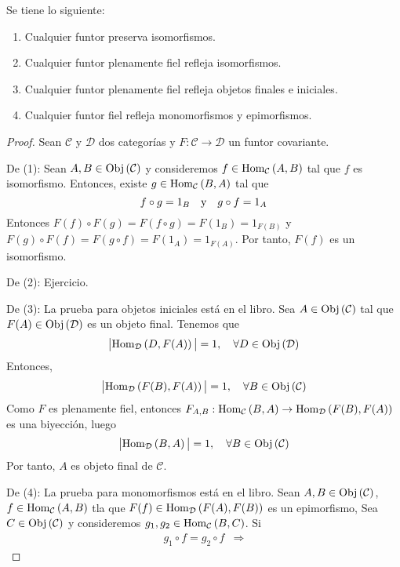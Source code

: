 \documentclass[12pt]{report}
\theoremstyle{largebreak}
\newcommand\abs[1]{\ensuremath{\big|#1\big|}}
\newcommand\cf[3]{\ensuremath{#1:#2\rightarrow#3}}
\newcommand{\Obj}[1]{\ensuremath{\textup{Obj}\left(#1\right)}}
\newcommand{\Hom}[3]{\ensuremath{\textup{Hom}_{#1}\left(#2,#3\right)}}
\begin{document}
    \begin{propo}
        Se tiene lo siguiente:
        \begin{enumerate}
            \item Cualquier funtor preserva isomorfismos.
            \item Cualquier funtor plenamente fiel refleja isomorfismos.
            \item Cualquier funtor plenamente fiel refleja objetos finales e iniciales.
            \item Cualquier funtor fiel refleja monomorfismos y epimorfismos.
        \end{enumerate}
    \end{propo}

    \begin{proof}
        Sean $\mathcal{C}$ y $\mathcal{D}$ dos categorías y $\cf{F}{\mathcal{C}}{\mathcal{D}}$ un funtor covariante.

        De (1): Sean $A,B\in\Obj{\mathcal{C}}$ y consideremos $f\in\Hom{\mathcal{C}}{A}{B}$ tal que $f$ es isomorfismo. Entonces, existe $g\in\Hom{\mathcal{C}}{B}{A}$ tal que
        \begin{equation*}
            f\circ g=1_B\quad\textup{y}\quad g\circ f=1_A
        \end{equation*}
        Entonces $F(f)\circ F(g)=F(f\circ g)=F(1_B)=1_{F(B)}$ y $F(g)\circ F(f)=F(g\circ f)=F(1_A)=1_{F(A)}$.
        Por tanto, $F(f)$ es un isomorfismo.

        De (2): Ejercicio.

        De (3): La prueba para objetos iniciales está en el libro. Sea $A\in\Obj{\mathcal{C}}$ tal que $F(A)\in\Obj{\mathcal{D}}$ es un objeto final. Tenemos que
        \begin{equation*}
            \abs{\Hom{\mathcal{D}}{D}{F(A)}}=1,\quad\forall D\in\Obj{\mathcal{D}}
        \end{equation*}
        Entonces,
        \begin{equation*}
            \abs{\Hom{\mathcal{D}}{F(B)}{F(A)}}=1,\quad\forall B\in\Obj{\mathcal{C}}
        \end{equation*}
        Como $F$ es plenamente fiel, entonces $\cf{F_{A,B}}{\Hom{\mathcal{C}}{B}{A}}{\Hom{\mathcal{D}}{F(B)}{F(A)}}$ es una biyección, luego
        \begin{equation*}
            \abs{\Hom{\mathcal{D}}{B}{A}}=1,\quad\forall B\in\Obj{\mathcal{C}}
        \end{equation*}
        Por tanto, $A$ es objeto final de $\mathcal{C}$.

        De (4): La prueba para monomorfismos está en el libro. Sean $A,B\in\Obj{\mathcal{C}}$, $f\in\Hom{\mathcal{C}}{A}{B}$ tla que $F(f)\in\Hom{\mathcal{D}}{F(A)}{F(B)}$ es un epimorfismo, Sea $C\in\Obj{\mathcal{C}}$ y consideremos $g_1,g_2\in\Hom{\mathcal{C}}{B}{C}$. Si
        \begin{equation*}
            \begin{split}
                g_1\circ f=g_2\circ f&\Rightarrow
            \end{split}
        \end{equation*}
    \end{proof}
\end{document}

